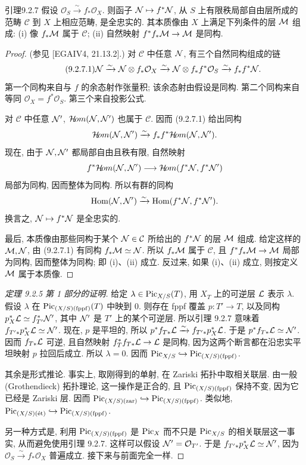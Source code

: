 \begin{origstatement}{引理}{9.2.7}\label{ch09s02:lem927}
假设 $\mathcal O_S\xrightarrow{\sim}f_*\mathcal O_X$. 则函子 $\N\mapsto f^*\N$, 从 $S$ 上有限秩局部自由层所成的范畴 $\mathcal C$ 到 $X$ 上相应范畴, 是全忠实的. 其本质像由 $X$ 上满足下列条件的层 $\M$ 组成: (i) 像 $f_*\M$ 属于 $\mathcal C$; (ii) 自然映射 $f^*f_*\M\to\M$ 是同构.
\end{origstatement}
\begin{proof}
(参见 [EGAIV4, 21.13.2].) 对 $\mathcal C$ 中任意 $\N$, 有三个自然同构组成的链
\begin{equation}
\tag{9.2.7.1}\label{ch09s02:eq9271}
\N\xrightarrow{\sim}\N\otimes f_*\mathcal O_X
\xrightarrow{\sim}\N\otimes f_*f^*\mathcal O_S
\xrightarrow{\sim}f_*f^*\N.
\end{equation}
第一个同构来自与 $f$ 的余态射作张量积; 该余态射由假设是同构. 第二个同构来自等同 $\mathcal O_X=f^*\mathcal O_S$. 第三个来自投影公式.

对 $\mathcal C$ 中任意 $\N'$, $\sHom(\N,\N')$ 也属于 $\mathcal C$. 因而 (9.2.7.1) 给出同构
\[
\sHom(\N,\N')\xrightarrow{\sim}f_*f^*\sHom(\N,\N').
\]
现在, 由于 $\N,\N'$ 都局部自由且秩有限, 自然映射
\[
f^*\sHom(\N,\N')\longrightarrow\sHom(f^*\N,f^*\N')
\]
局部为同构, 因而整体为同构. 所以有群的同构
\[
\Hom(\N,\N')\xrightarrow{\sim}\Hom(f^*\N,f^*\N').
\]
换言之, $\N\mapsto f^*\N$ 是全忠实的.

最后, 本质像由那些同构于某个 $\N\in\mathcal C$ 所给出的 $f^*\N$ 的层 $\M$ 组成. 给定这样的 $\M,\N$, 由 (9.2.7.1) 有同构 $f_*\M\simeq\N$. 所以 $f_*\M$ 属于 $\mathcal C$, 且 $f^*f_*\M\to\M$ 局部为同构, 因而整体为同构; 即 (i)、(ii) 成立. 反过来, 如果 (i)、(ii) 成立, 则按定义 $\M$ 属于本质像.
\end{proof}

\begin{proof}[定理 9.2.5 第 1 部分的证明]
给定 $\lambda\in\Pic_{X/S}(T)$, 用 $X_T$ 上的可逆层 $\L$ 表示 $\lambda$. 假设 $\lambda$ 在 $\PF(T)$ 中映到 $0$. 则存在 fppf 覆盖 $p:T'\to T$, 以及同构 $p_X^*\L\simeq f_{T'}^*\N'$, 其中 $\N'$ 是 $T'$ 上的某个可逆层. 所以引理 9.2.7 意味着 $f_{T'*}p_X^*\L\simeq\N'$. 现在, $p$ 是平坦的, 所以 $p^*f_{T*}\L\xrightarrow{\sim}f_{T'*}p_X^*\L$. 于是 $p^*f_{T*}\L\simeq\N'$. 因而 $f_{T*}\L$ 可逆, 且自然映射 $f_T^*f_{T*}\L\to\L$ 是同构, 因为这两个断言都在沿忠实平坦映射 $p$ 拉回后成立. 所以 $\lambda=0$. 因而 $\Pic_{X/S}\hookrightarrow\PF$.

其余是形式推论. 事实上, 取刚得到的单射, 在 Zariski 拓扑中取相关联层. 由一般 (Grothendieck) 拓扑理论, 这一操作是正合的, 且 $\PF$ 保持不变, 因为它已经是 Zariski 层. 因而 $\PZ\hookrightarrow\PF$. 类似地, $\PE\hookrightarrow\PF$.

另一种方式是, 利用 $\PF$ 是 $\Pic_X$ 而不只是 $\Pic_{X/S}$ 的相关联层这一事实, 从而避免使用引理 9.2.7. 这样可以假设 $\N'=\mathcal O_{T'}$. 于是 $f_{T'*}p_X^*\L\simeq\N'$, 因为 $\mathcal O_S\xrightarrow{\sim}f_*\mathcal O_X$ 普遍成立. 接下来与前面完全一样.
\end{proof}

